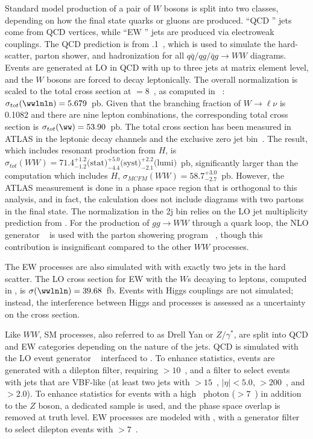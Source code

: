 Standard model production of a pair of $W$ bosons is split into two
classes, depending on how the final state quarks or gluons are
produced. ``QCD \ww'' jets come from QCD vertices, while ``EW \ww''
jets are produced via electroweak couplings. The QCD \ww prediction is from .1~\cite{bib:Gleisberg:2008ta}, which is used to
simulate the hard-scatter, parton shower, and hadronization for all
$q\bar{q}/qg/\bar{q}g\rightarrow{WW}$ diagrams. Events are generated
at LO in QCD with up to three jets at matrix element level, and the
$W$ bosons are forced to decay leptonically. The overall normalization is
scaled to the total \ww cross section at \sqrts$=8$~\tev, as computed
in \MCFM~\cite{bib:Campbell:2011bn}: $\sigma_{tot}(\wwlnln) = 5.679$~pb. Given that the branching
fraction of $W\rightarrow{\ell\nu}$ is 0.1082 and there are nine
lepton combinations, the corresponding total cross section is
$\sigma_{tot}(\ww) = 53.90$~pb. The total \ww cross section has been
measured in ATLAS in the \ww leptonic decay channels and the exclusive
zero jet bin~\cite{bib:ww_cross_section}. The result, which includes
resonant \ww production from $H$, is
$\sigma_{tot}(WW) = 71.4^{+1.2}_{-1.2} \textrm{(stat)} ^{+5.0}_{-4.4}
\textrm{(syst)}^{+2.2}_{-2.1}\textrm{(lumi)}$~pb, significantly larger
than the \MCFM computation which includes $H$, $\sigma_{MCFM}(WW) =
58.7^{+3.0}_{-2.7}$~pb. However, the ATLAS measurement is done in a
phase space region that is orthogonal to this analysis, and in fact,
the \MCFM calculation does not include diagrams with two partons in the final
state. The normalization in the 2j bin relies on the LO jet
multiplicity prediction from \SHERPA. For the production of
$gg\rightarrow{WW}$ through a quark loop, the NLO generator \GGTOWW~\cite{bib:Binoth:2006mf} is
used with the parton showering program
\HERWIG~\cite{bib:Corcella:2000bw}, though this contribution is
insignificant compared to the other $WW$ processes. 

The EW \ww processes are also simulated with \SHERPA with exactly two
jets in the hard scatter. The LO cross section for EW \ww with the
$W$s decaying to leptons, computed in \SHERPA, is $\sigma(\wwlnln) =
39.68$~fb. Events with Higgs couplings are not simulated; instead, the
interference between Higgs and \ww processes is assessed as a
uncertainty on the cross section. 

Like $WW$, SM \zjets processes, also referred to as Drell Yan or
$Z/\gamma^\ast$, are split into QCD and EW categories
depending on the nature of the jets. QCD \zjets is simulated with the
LO event generator \ALPGEN~\cite{bib:Mangano:2002ea} interfaced to
\HERWIG. To enhance statistics, events are generated with a dilepton
filter, requiring \mll$>10$~\gev, and a filter to select events with jets that are VBF-like (at
least two jets with \pt$>15$~\gev, $|\eta| < 5.0$, \mjj$>200$~\gev,
and \dyjj$>2.0$). To enhance statistics for events with a
high \pt~photon (\pt$>7$~\gev) in addition to the $Z$ boson, a
dedicated \SHERPA sample is used, and the phase space overlap is removed at truth
level. EW \zjets processes are modeled with \SHERPA, with a generator
filter to select dilepton events with \mll$>7$~\gev. 

